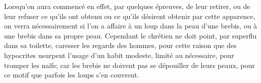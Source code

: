 Lorsqu’on aura commencé en effet, par quelques épreuves,
	de leur retirer, ou de leur refuser ce qu’ils ont obtenu
		ou ce qu’ils désirent obtenir par cette apparence,
	on verra nécessairement
		si l’on a affaire à un loup dans la peau d’une brebis,
	ou à une brebis dans sa propre peau.
Cependant le chrétien ne doit point, par superflu dans sa toilette,
		caresser les regards des hommes,
	pour cette raison que des hypocrites usurpent l’usage d’un habit modeste,
	limité au nécessaire, pour tromper les naïfs;
	car les brebis ne doivent pas se dépouiller de leurs peaux,
	pour ce motif que parfois les loups s’en couvrent.
